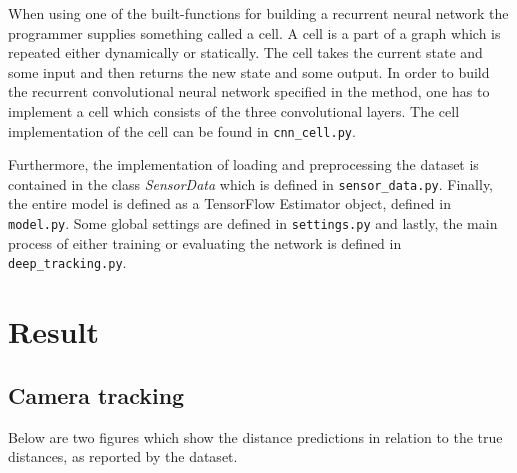 \documentclass[a4paper]{article}
\begin{document}
When using one of the built-functions for building a recurrent neural network the programmer supplies something called a cell.
A cell is a part of a graph which is repeated either dynamically or statically.
The cell takes the current state and some input and then returns the new state and some output.
In order to build the recurrent convolutional neural network specified in the method, one has to implement a cell which consists of the three convolutional layers.
The cell implementation of the cell can be found in \texttt{cnn\_cell.py}.

Furthermore, the implementation of loading and preprocessing the dataset is contained in the class \emph{SensorData} which is defined in \texttt{sensor\_data.py}.
Finally, the entire model is defined as a TensorFlow Estimator object, defined in \texttt{model.py}.
Some global settings are defined in \texttt{settings.py} and lastly, the main process of either training or evaluating the network is defined in \texttt{deep\_tracking.py}.

\section{Result}

\subsection{Camera tracking}
Below are two figures which show the distance predictions in relation to the
true distances, as reported by the dataset.
\end{document}
